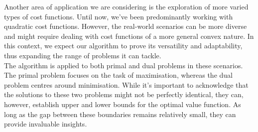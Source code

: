 Another area of application we are considering is the exploration of more varied types of cost functions. Until now, we've been predominantly working with quadratic cost functions. However, the real-world scenarios can be more diverse and might require dealing with cost functions of a more general convex nature. In this context, we expect our algorithm to prove its versatility and adaptability, thus expanding the range of problems it can tackle.\\

The algorithm is applied to both primal and dual problems in these scenarios. The primal problem focuses on the task of maximisation, whereas the dual problem centres around minimisation. While it's important to acknowledge that the solutions to these two problems might not be perfectly identical, they can, however, establish upper and lower bounds for the optimal value function. As long as the gap between these boundaries remains relatively small, they can provide invaluable insights. 